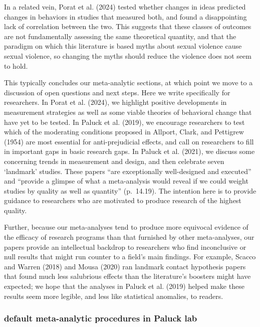 \documentclass[
  man]{apa6}
\begin{document}
In a related vein, Porat et al. (2024) tested whether changes in ideas predicted changes in behaviors in studies that measured both, and found a disappointing lack of correlation between the two. This suggests that these classes of outcomes are not fundamentally assessing the same theoretical quantity, and that the paradigm on which this literature is based \textemdash myths about sexual violence cause sexual violence, so changing the myths should reduce the violence \textemdash does not seem to hold.

This typically concludes our meta-analytic sections, at which point we move to a discussion of open questions and next steps. Here we write specifically for researchers. In Porat et al. (2024), we highlight positive developments in measurement strategies as well as some viable theories of behavioral change that have yet to be tested. In Paluck et al. (2019), we encourage researchers to test which of the moderating conditions proposed in Allport, Clark, and Pettigrew (1954) are most essential for anti-prejudicial effects, and call on researchers to fill in important gaps in basic research gaps. In Paluck et al. (2021), we discuss some concerning trends in measurement and design, and then celebrate seven `landmark' studies. These papers ``are exceptionally well-designed and executed'' and ``provide a glimpse of what a meta-analysis would reveal if we could weight studies by quality as well as quantity'' (p.~14.19). The intention here is to provide guidance to researchers who are motivated to produce research of the highest quality.

Further, because our meta-analyses tend to produce more equivocal evidence of the efficacy of research programs than that furnished by other meta-analyses, our papers provide an intellectual backdrop to researchers who find inconclusive or null results that might run counter to a field's main findings. For example, Scacco and Warren (2018) and Mousa (2020) ran landmark contact hypothesis papers that found much less salubrious effects than the literature's boosters might have expected; we hope that the analyses in Paluck et al. (2019) helped make these results seem more legible, and less like statistical anomalies, to readers.

\subsubsection{default meta-analytic procedures in Paluck lab}\label{default-meta-analytic-procedures-in-paluck-lab}
\end{document}
